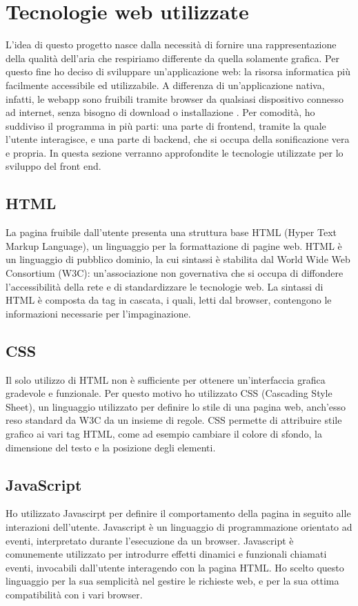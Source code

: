 \section{Tecnologie web utilizzate}
L'idea di questo progetto nasce dalla necessità di fornire una rappresentazione della qualità dell'aria che respiriamo differente da quella solamente grafica.
Per questo fine ho deciso di sviluppare un'applicazione web: la risorsa informatica più facilmente accessibile ed utilizzabile.
A differenza di un'applicazione nativa, infatti, le webapp sono fruibili tramite browser da qualsiasi dispositivo connesso ad internet, senza bisogno di download o installazione \cite{appdiffs}.
Per comodità, ho suddiviso il programma in più parti: una parte di frontend, tramite la quale l'utente interagisce, e una parte di backend, che si occupa della sonificazione vera e propria.
In questa sezione verranno approfondite le tecnologie utilizzate per lo sviluppo del front end.

\subsection{HTML}
La pagina fruibile dall'utente presenta una struttura base HTML (Hyper Text Markup Language), un linguaggio per la formattazione di pagine web.
HTML è un linguaggio di pubblico dominio, la cui sintassi è stabilita dal World Wide Web Consortium (W3C): un'associazione non governativa che si occupa di diffondere l'accessibilità della rete e di standardizzare le tecnologie web.
La sintassi di HTML è composta da tag in cascata, i quali, letti dal browser, contengono le informazioni necessarie per l'impaginazione.

\subsection{CSS}
Il solo utilizzo di HTML non è sufficiente per ottenere un'interfaccia grafica gradevole e funzionale.
Per questo motivo ho utilizzato CSS (Cascading Style Sheet), un linguaggio utilizzato per definire lo stile di una pagina web, anch'esso reso standard da W3C da un insieme di regole.
CSS permette di attribuire stile grafico ai vari tag HTML, come ad esempio cambiare il colore di sfondo, la dimensione del testo e la posizione degli elementi.

\subsection{JavaScript}
Ho utilizzato Javascirpt per definire il comportamento della pagina in seguito alle interazioni dell'utente.
Javascript è un linguaggio di programmazione orientato ad eventi, interpretato durante l'esecuzione da un browser.
Javascript è comunemente utilizzato per introdurre effetti dinamici e funzionali chiamati eventi, invocabili dall'utente interagendo con la pagina HTML.
Ho scelto questo linguaggio per la sua semplicità nel gestire le richieste web, e per la sua ottima compatibilità con i vari browser.


